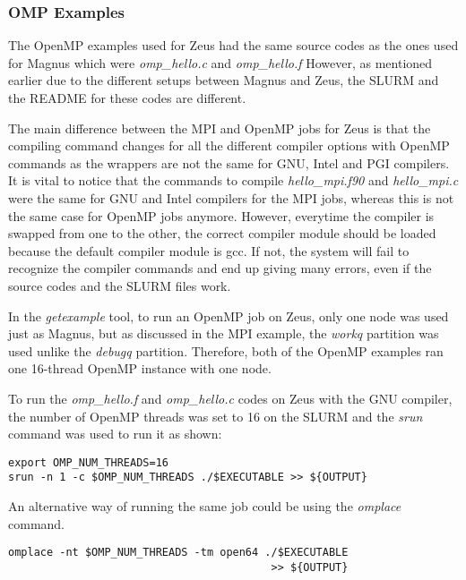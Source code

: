 \subsubsection{OMP Examples}

The OpenMP examples used for Zeus had the same source codes as the ones used for Magnus which were \emph{omp\_hello.c} and \emph{omp\_hello.f}
However, as mentioned earlier due to the different setups between Magnus and Zeus, the SLURM and the README for these codes are different.

The main difference between the MPI and OpenMP jobs for Zeus is that the compiling command changes for all the different compiler options with OpenMP
commands as the wrappers are not the same for GNU, Intel and PGI compilers. It is vital to notice that the commands to compile \emph{hello\_mpi.f90} and
\emph{hello\_mpi.c} were the same for GNU and Intel compilers for the MPI jobs, whereas this is not the same case for OpenMP jobs anymore. However, 
everytime the compiler is swapped from one to the other, the correct compiler module should be loaded because the default compiler module is gcc. If not, 
the system will fail to recognize the compiler commands and end up giving many errors, even if the source codes and the SLURM files work.

In the \emph{getexample} tool, to run an OpenMP job on Zeus, only one node was used just as Magnus, but as discussed in the MPI example, the \emph{workq} 
partition was used unlike the \emph{debugq} partition. Therefore, both of the OpenMP examples ran one 16-thread OpenMP instance with one node.

To run the \emph{omp\_hello.f} and \emph{omp\_hello.c} codes on Zeus with the GNU compiler, the number of OpenMP threads was set to 16 on the SLURM and 
the \emph{srun} command was used to run it as shown:

\begin{tcolorbox}
\begin{Verbatim}[fontsize=\scriptsize]
export OMP_NUM_THREADS=16
srun -n 1 -c $OMP_NUM_THREADS ./$EXECUTABLE >> ${OUTPUT}
\end{Verbatim}
\end{tcolorbox}

An alternative way of running the same job could be using the \emph{omplace} command.

\begin{tcolorbox}
\begin{Verbatim}[fontsize=\scriptsize]
omplace -nt $OMP_NUM_THREADS -tm open64 ./$EXECUTABLE 
                                         >> ${OUTPUT}
\end{Verbatim}
\end{tcolorbox}

